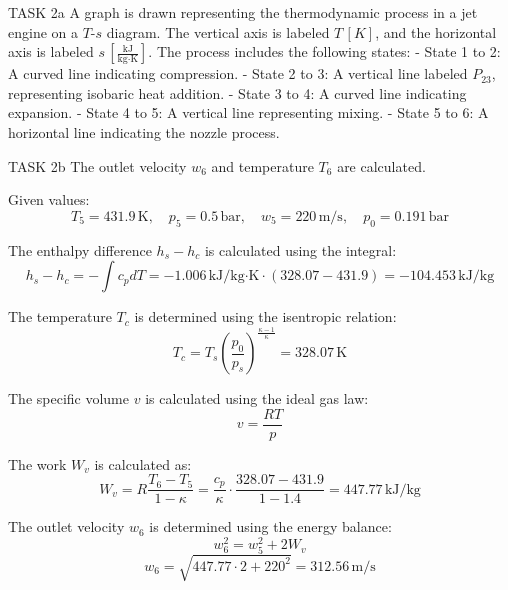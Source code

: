 TASK 2a  
A graph is drawn representing the thermodynamic process in a jet engine on a \( T \)-\( s \) diagram. The vertical axis is labeled \( T \, [K] \), and the horizontal axis is labeled \( s \, \left[\frac{\text{kJ}}{\text{kg·K}}\right] \). The process includes the following states:  
- State 1 to 2: A curved line indicating compression.  
- State 2 to 3: A vertical line labeled \( P_{23} \), representing isobaric heat addition.  
- State 3 to 4: A curved line indicating expansion.  
- State 4 to 5: A vertical line representing mixing.  
- State 5 to 6: A horizontal line indicating the nozzle process.  

TASK 2b  
The outlet velocity \( w_6 \) and temperature \( T_6 \) are calculated.  

Given values:  
\[
T_5 = 431.9 \, \text{K}, \quad p_5 = 0.5 \, \text{bar}, \quad w_5 = 220 \, \text{m/s}, \quad p_0 = 0.191 \, \text{bar}
\]

The enthalpy difference \( h_s - h_c \) is calculated using the integral:  
\[
h_s - h_c = -\int c_p dT = -1.006 \, \text{kJ/kg·K} \cdot (328.07 - 431.9) = -104.453 \, \text{kJ/kg}
\]

The temperature \( T_c \) is determined using the isentropic relation:  
\[
T_c = T_s \left( \frac{p_0}{p_s} \right)^{\frac{\kappa - 1}{\kappa}} = 328.07 \, \text{K}
\]

The specific volume \( v \) is calculated using the ideal gas law:  
\[
v = \frac{RT}{p}
\]

The work \( W_v \) is calculated as:  
\[
W_v = R \frac{T_6 - T_5}{1 - \kappa} = \frac{c_p}{\kappa} \cdot \frac{328.07 - 431.9}{1 - 1.4} = 447.77 \, \text{kJ/kg}
\]

The outlet velocity \( w_6 \) is determined using the energy balance:  
\[
w_6^2 = w_5^2 + 2W_v
\]
\[
w_6 = \sqrt{447.77 \cdot 2 + 220^2} = 312.56 \, \text{m/s}
\]